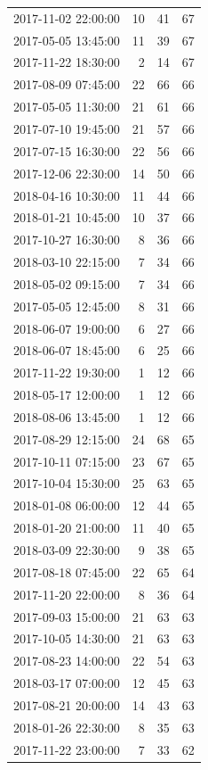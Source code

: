 \begin{tabular}{lrrr}
2017-11-02 22:00:00 & 10 & 41 & 67 \\
2017-05-05 13:45:00 & 11 & 39 & 67 \\
2017-11-22 18:30:00 & 2 & 14 & 67 \\
2017-08-09 07:45:00 & 22 & 66 & 66 \\
2017-05-05 11:30:00 & 21 & 61 & 66 \\
2017-07-10 19:45:00 & 21 & 57 & 66 \\
2017-07-15 16:30:00 & 22 & 56 & 66 \\
2017-12-06 22:30:00 & 14 & 50 & 66 \\
2018-04-16 10:30:00 & 11 & 44 & 66 \\
2018-01-21 10:45:00 & 10 & 37 & 66 \\
2017-10-27 16:30:00 & 8 & 36 & 66 \\
2018-03-10 22:15:00 & 7 & 34 & 66 \\
2018-05-02 09:15:00 & 7 & 34 & 66 \\
2017-05-05 12:45:00 & 8 & 31 & 66 \\
2018-06-07 19:00:00 & 6 & 27 & 66 \\
2018-06-07 18:45:00 & 6 & 25 & 66 \\
2017-11-22 19:30:00 & 1 & 12 & 66 \\
2018-05-17 12:00:00 & 1 & 12 & 66 \\
2018-08-06 13:45:00 & 1 & 12 & 66 \\
2017-08-29 12:15:00 & 24 & 68 & 65 \\
2017-10-11 07:15:00 & 23 & 67 & 65 \\
2017-10-04 15:30:00 & 25 & 63 & 65 \\
2018-01-08 06:00:00 & 12 & 44 & 65 \\
2018-01-20 21:00:00 & 11 & 40 & 65 \\
2018-03-09 22:30:00 & 9 & 38 & 65 \\
2017-08-18 07:45:00 & 22 & 65 & 64 \\
2017-11-20 22:00:00 & 8 & 36 & 64 \\
2017-09-03 15:00:00 & 21 & 63 & 63 \\
2017-10-05 14:30:00 & 21 & 63 & 63 \\
2017-08-23 14:00:00 & 22 & 54 & 63 \\
2018-03-17 07:00:00 & 12 & 45 & 63 \\
2017-08-21 20:00:00 & 14 & 43 & 63 \\
2018-01-26 22:30:00 & 8 & 35 & 63 \\
2017-11-22 23:00:00 & 7 & 33 & 62 \\

\end{tabular}
